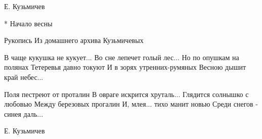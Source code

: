 Е. Кузьмичев


* Начало весны

Рукопись
Из домашнего архива Кузьмичевых

В чаще кукушка не кукует...
    Во сне лепечет голый лес...
Но по опушкам на полянах
Тетеревья давно токуют
И в зорях утренних-румяных
    Весною дышит край небес...

Поля пестреют от проталин
    В овраге искрится хруталь...
Глядится солнышко с любовью
Между березовых прогалин
И, млея... тихо манит новью
    Среди снегов - синея даль...

Е. Кузьмичев
